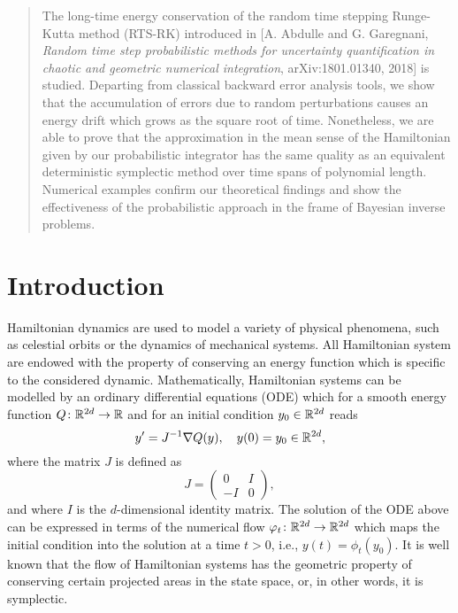 \documentclass[10pt]{article}
\begin{document}
\maketitle

\begin{abstract} The long-time energy conservation of the random time stepping Runge-Kutta method (RTS-RK) introduced in [A. Abdulle and G. Garegnani, \textit{Random time step probabilistic methods for uncertainty quantification in chaotic and geometric numerical integration}, arXiv:1801.01340, 2018] is studied. Departing from classical backward error analysis tools, we show that the accumulation of errors due to random perturbations causes an energy drift which grows as the square root of time. Nonetheless, we are able to prove that the approximation in the mean sense of the Hamiltonian given by our probabilistic integrator has the same quality as an equivalent deterministic symplectic method over time spans of polynomial length. Numerical examples confirm our theoretical findings and show the effectiveness of the probabilistic approach in the frame of Bayesian inverse problems.
\end{abstract}

\section{Introduction}

Hamiltonian dynamics are used to model a variety of physical phenomena, such as celestial orbits or the dynamics of mechanical systems. All Hamiltonian system are endowed with the property of conserving an energy function which is specific to the considered dynamic. Mathematically, Hamiltonian systems can be modelled by an ordinary differential equations (ODE) which for a smooth energy function $Q\colon \mathbb{R}^{2d} \to \mathbb{R}$ and for an initial condition $y_0 \in \mathbb{R}^{2d}$ reads
\begin{equation}
y' = J^{-1}\nabla Q(y), \quad y(0) = y_0 \in \mathbb{R}^{2d},
\end{equation}
where the matrix $J$ is defined as
\begin{equation}
J = \begin{pmatrix} 0 & I \\ -I & 0 \end{pmatrix},
\end{equation}
and where $I$ is the $d$-dimensional identity matrix. The solution of the ODE above can be expressed in terms of the numerical flow $\varphi_t \colon \mathbb{R}^{2d} \to \mathbb{R}^{2d}$ which maps the initial condition into the solution at a time $t > 0$, i.e., $y(t) = \phi_t(y_0)$. It is well known that the flow of Hamiltonian systems has the geometric property of conserving certain projected areas in the state space, or, in other words, it is symplectic. 
\end{document}
